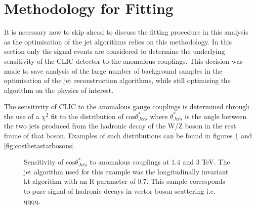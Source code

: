 \section{Methodology for Fitting}

It is necessary now to skip ahead to discuss the fitting procedure in this analysis as the optimisation of the jet algorithms relies on this methodology. In this section only the signal events are considered to determine the underlying sensitivity of the CLIC detector to the anomalous couplings. This decision was made to save analysis of the large number of background samples in the optimisation of the jet reconstruction algorithms, while still optimising the algorithm on the physics of interest.

The sensitivity of CLIC to the anomalous gauge couplings is determined through the use of a $\chi^{2}$ fit to the distribution of $\text{cos}\theta^{*}_{Jets}$ where $\theta^{*}_{Jets}$ is the angle between the two jets produced from the hadronic decay of the W/Z boson in the rest frame of that boson.  Examples of such distributions can be found in figures \ref{fig:costhetastarjets} and \ref{fig:costhetastarbosons}.  

\begin{figure}
\caption[Sensitivity of $\text{cos}\theta^{8}_{Jets}$ to the anomalous gauge couplings $\alpha_{4}$ and $\alpha_{5}$ at 1.4 and 3 TeV.]{Sensitivity of $\text{cos}\theta^{*}_{Jets}$ to anomalous couplings at 1.4 and 3 TeV. The jet algorithm used for this example was the longitudinally invariant kt algorithm with an R parameter of 0.7. This sample corresponds to pure signal of hadronic decays in vector boson scattering i.e. \nu{\nu}qqqq.}
\label{fig:costhetastarjets}
\end{figure}

